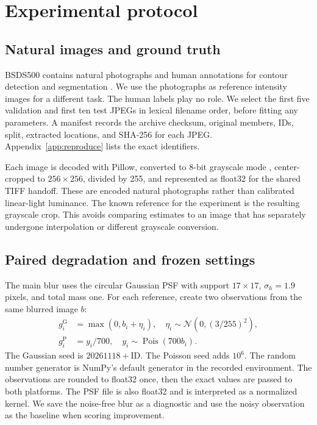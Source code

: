 \section{Experimental protocol}
\label{sec:protocol}

\subsection{Natural images and ground truth}

BSDS500 contains natural photographs and human annotations for contour detection and segmentation \citep{bsds,bsdsdata}. We use the photographs as reference intensity images for a different task. The human labels play no role. We select the first five validation and first ten test JPEGs in lexical filename order, before fitting any parameters. A manifest records the archive checksum, original members, IDs, split, extracted locations, and SHA-256 for each JPEG. Appendix~\ref{app:reproduce} lists the exact identifiers.

Each image is decoded with Pillow, converted to 8-bit grayscale mode , center-cropped to \(256\times256\), divided by 255, and represented as float32 for the shared TIFF handoff. These are encoded natural photographs rather than calibrated linear-light luminance. The known reference for the experiment is the resulting grayscale crop. This avoids comparing estimates to an image that has separately undergone interpolation or different grayscale conversion.

\subsection{Paired degradation and frozen settings}

The main blur uses the circular Gaussian PSF with support \(17\times17\), \(\sigma_h=1.9\) pixels, and total mass one. For each reference, create two observations from the same blurred image \(b\):
\begin{align}
g_i^{\mathrm G} &= \max(0,b_i+\eta_i),
\quad \eta_i\sim\mathcal N(0,(3/255)^2),\\
g_i^{\mathrm P} &= y_i/700,\quad y_i\sim\operatorname{Pois}(700b_i).
\end{align}
The Gaussian seed is \(20261118+\mathrm{ID}\). The Poisson seed adds \(10^6\). The random number generator is NumPy's default generator in the recorded environment. The observations are rounded to float32 once, then the exact values are passed to both platforms. The PSF file is also float32 and is interpreted as a normalized kernel. We save the noise-free blur as a diagnostic and use the noisy observation as the baseline when scoring improvement.

